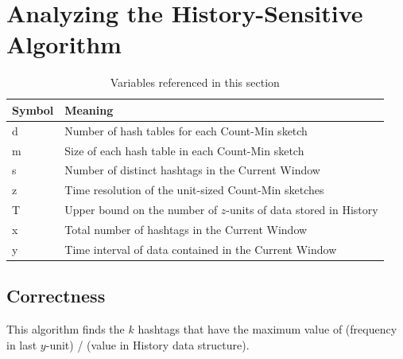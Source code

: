 \documentclass[twoside]{article}
\begin{document}
\section{Analyzing the History-Sensitive Algorithm}

\begin{table}[h]
\centering
\begin{tabular}{@{}ll@{}}
\toprule
Symbol & Meaning                                                           \\ \midrule
d      & Number of hash tables for each Count-Min sketch                        \\
m      & Size of each hash table in each Count-Min sketch                  \\
s      & Number of distinct hashtags in the Current Window                 \\
z      & Time resolution of the unit-sized Count-Min sketches                   \\
T      & Upper bound on the number of $z$-units of data stored in History                   \\
x      & Total number of hashtags in the Current Window                   \\
y      & Time interval of data contained in the Current Window                   \\ \bottomrule
\end{tabular}
\caption{Variables referenced in this section}
\end{table}

\subsection{Correctness} \label{sec:Correctness}

This algorithm finds the $k$ hashtags that have the maximum value of (frequency in last $y$-unit) / (value in History data structure).
\end{document}
